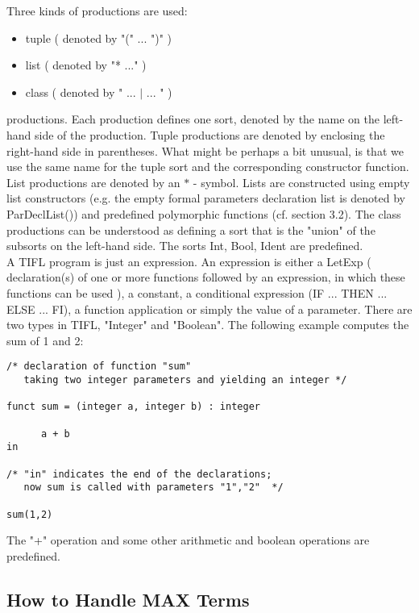 \noindent
Three kinds of productions are used:
\begin{itemize}
\item tuple  ( denoted by  "(" ... ")" )
\item list  ( denoted by  "* ..." )
\item class   ( denoted by  " ... $\mid$ ... " ) 
\end{itemize}
productions.
Each production defines one sort, denoted by the name on the left-hand side of the production. Tuple productions are denoted by enclosing the right-hand side in parentheses. What might be perhaps a bit unusual, is that we use the same name for the tuple sort and the corresponding constructor function. List productions are denoted by an $\ast$ - symbol. Lists are constructed using empty list constructors (e.g. the empty formal parameters declaration list is denoted by ParDeclList()) and predefined polymorphic functions (cf. section 3.2). The class productions can be understood as defining a sort that is the "union" of the subsorts on the left-hand side. The sorts Int, Bool, Ident are predefined.\\
A TIFL program is just an expression. An expression is either a LetExp ( declaration(s) of one or more functions followed by an expression, in which these functions can be used ), a constant,
a conditional expression (IF ... THEN ... ELSE ... FI), a function application or simply the value of a parameter. There are two types in TIFL, "Integer"
and "Boolean". The following example computes the sum of 1 and 2:
\begin{verbatim}
/* declaration of function "sum"
   taking two integer parameters and yielding an integer */

funct sum = (integer a, integer b) : integer

      a + b
in

/* "in" indicates the end of the declarations;
   now sum is called with parameters "1","2"  */

sum(1,2)
\end{verbatim}
The "+" operation and some other arithmetic and boolean operations are 
predefined.

\subsection{How to Handle MAX Terms}

